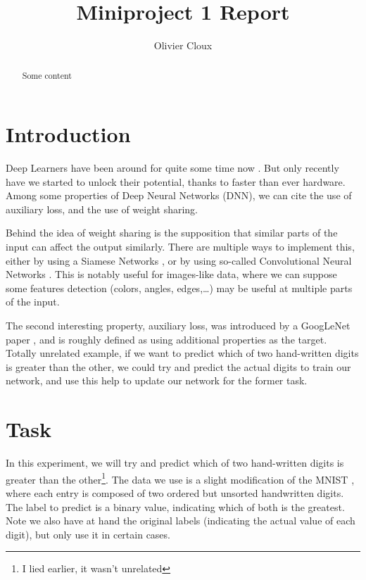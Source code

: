 \documentclass[10pt,conference]{IEEEtran}
\begin{document}
\title{Miniproject 1 Report}
\author[1]{Olivier Cloux}

\maketitle

\begin{abstract}
Some content
\end{abstract}

\section{Introduction}
Deep Learners have been around for quite some time now \cite{noauthor_deep_2020}. But only recently have we started to unlock their potential, thanks to faster than ever hardware. Among some properties of Deep Neural Networks (DNN), we can cite the use of auxiliary loss, and the use of weight sharing.

Behind the idea of weight sharing is the supposition that similar parts of the input can affect the output similarly. There are multiple ways to implement this, either by using a Siamese Networks \cite{noauthor_siamese_2020}, or by using so-called Convolutional Neural Networks \cite{noauthor_convolutional_2020}. This is notably useful for images-like data, where we can suppose some features detection (colors, angles, edges,\ldots) may be useful at multiple parts of the input.

The second interesting property, auxiliary loss, was introduced by a GoogLeNet paper \cite{szegedy_going_2014}, and is roughly defined as using additional properties as the target. Totally unrelated example, if we want to predict which of two hand-written digits is greater than the other, we could try and predict the actual digits to train our network, and use this help to update our network for the former task.

\section{Task}
In this experiment, we will try and predict which of two hand-written digits is greater than the other\footnote{I lied earlier, it wasn't unrelated}. The data we use is a slight modification of the MNIST \cite{lecun_mnist_1998}, where each entry is composed of two ordered but unsorted handwritten digits. The label to predict is a binary value, indicating which of both is the greatest. Note we also have at hand the original labels (indicating the actual value of each digit), but only use it in certain cases.
\end{document}
